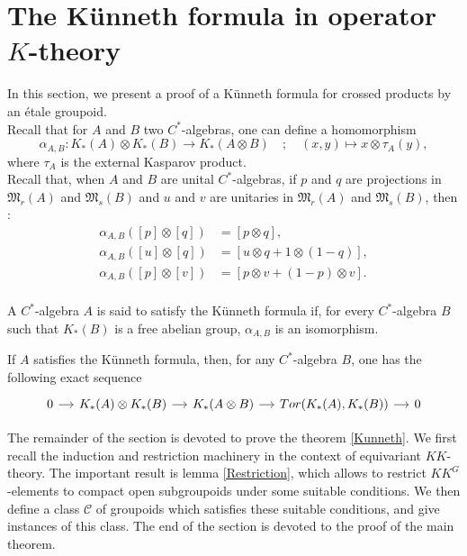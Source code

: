 \section{The Künneth formula in operator $K$-theory}

In this section, we present a proof of a Künneth formula for crossed products by an étale groupoid. \\ 

Recall that for $A$ and $B$ two $C^*$-algebras, one can define a homomorphism
\[\alpha_{A,B} : K_*(A)\otimes K_*(B)\rightarrow K_*(A\otimes B) \quad ; \quad (x,y)\mapsto x\otimes   \tau_A(y),\]
where $\tau_A$ is the external Kasparov product.\\

Recall that, when $A$ and $B$ are unital $C^*$-algebras, if $p$ and $q$ are projections in $\mathfrak M_r(A)$ and $\mathfrak M_s(B)$ and $u$ and $v$ are unitaries in $\mathfrak M_r(A)$ and $\mathfrak M_s(B)$, then :
\[\begin{array}{rl}
\alpha_{A,B}([p]\otimes [q]) & = [p\otimes q], \\
\alpha_{A,B}([u]\otimes [q]) & = [u \otimes q +1\otimes (1-q)], \\
\alpha_{A,B}([p]\otimes [v]) & = [p\otimes v +(1-p)\otimes v] .\\
\end{array}\]

\begin{definition}
A $C^*$-algebra $A$ is said to satisfy the Künneth formula if, for every $C^*$-algebra $B$ such that $K_*(B)$ is a free abelian group, $\alpha_{A,B}$ is an isomorphism.
\end{definition}

If $A$ satisfies the Künneth formula, then, for any $C^*$-algebra $B$, one has the following exact sequence
\[\begin{tikzcd}[column sep = small] 0 \arrow{r} & K_*(A)\otimes K_*(B)\arrow{r} & K_*(A\otimes B) \arrow{r} & Tor(K_*(A),K_*(B))\arrow{r} & 0 \end{tikzcd}\]


The remainder of the section is devoted to prove the theorem \ref{Kunneth}. We first recall the induction and restriction machinery in the context of equivariant $KK$-theory. The important result is lemma \ref{Restriction}, which allows to restrict $KK^G$-elements to compact open subgroupoids under some suitable conditions. We then define a class $\mathcal C$ of groupoids which satisfies these suitable conditions, and give instances of this class. The end of the section is devoted to the proof of the main theorem.

